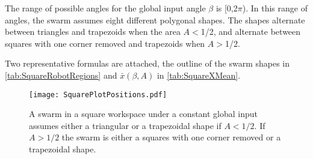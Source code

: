 \documentclass[conference]{IEEEtran}
\begin{document}
The range of possible angles for the global input angle $\beta $ is [0,2$\pi $). In this range of angles, the swarm assumes eight different polygonal shapes. The shapes alternate between triangles and trapezoids when the area $A$$<$1/2, and alternate between squares with one corner removed and trapezoids when $A$$>$1/2.

Two representative formulas are attached, the outline of the swarm shapes in \eqref{tab:SquareRobotRegions} and $\bar{x}(\beta,A)$ in \eqref{tab:SquareXMean}.




\begin{figure}[h]
\begin{center}
\texttt{[image: SquarePlotPositions.pdf]} 
\caption{A swarm in a square workspace under a constant global input assumes either a triangular or a trapezoidal shape if $A<1/2$.  If $A>1/2$ the swarm is either a squares with one corner removed or a trapezoidal  shape.}
\label{fig:friction}
\end{center}
\end{figure} 
\end{document}
